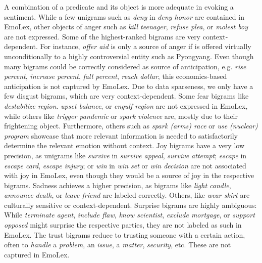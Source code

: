 A combination of a predicate and its object is more adequate in evoking a sentiment. 
While a few unigrams such as \textit{deny} in \textit{deny honor} are contained in EmoLex, other objects of anger such as \textit{kill teenager}, \textit{refuse plea}, or \textit{molest boy} are not expressed. Some of the highest-ranked bigrams are very context-dependent. For instance, \textit{offer aid} is only a source of anger if is offered virtually unconditionally to a highly controversial entity such as Pyongyang. Even though many bigrams could be correctly considered as source of anticipation, e.g. \textit{rise percent}, \textit{increase percent}, \textit{fall percent}, \textit{reach dollar}, this economics-based anticipation is not captured by EmoLex. Due to data sparseness, we only have a few disgust bigrams, which are very context-dependent.
Some fear bigrams like \textit{destabilize region}. \textit{upset balance}, or \textit{engulf region} are not expressed in EmoLex, while others like \textit{trigger pandemic} or \textit{spark violence} are, mostly due to their frightening object. Furthermore, others such as \textit{spark (arms) race} or \textit{use (nuclear) program} showcase that more relevant information is needed to satisfactorily determine the relevant emotion without context. Joy bigrams have a very low precision, as unigrams like \textit{survive} in \textit{survive appeal}, \textit{survive attempt}; \textit{escape} in \textit{escape card}, \textit{escape injury}; or \textit{win} in \textit{win set} or \textit{win decision} are not associated with joy in EmoLex, even though they would be a source of joy in the respective bigrams.
Sadness achieves a higher precision, as bigrams like \textit{light candle}, \textit{announce death}, or \textit{leave friend} are labeled correctly. Others, like \textit{wear skirt} are culturally sensitive or context-dependent.
Surprise bigrams are highly ambiguous: While \textit{terminate agent}, \textit{include flaw}, \textit{know scientist}, \textit{exclude mortgage}, or \textit{support opposed} might surprise the respective parties, they are not labeled as such in EmoLex.
The trust bigrams reduce to trusting someone with a certain action, often to \textit{handle} a \textit{problem}, an \textit{issue}, a \textit{matter}, \textit{security}, etc. These are not captured in EmoLex.

